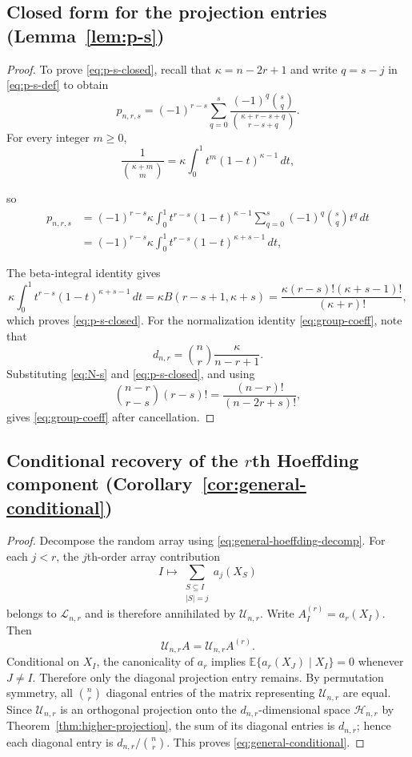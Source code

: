 \documentclass[11pt]{article}
\theoremstyle{plain}
\theoremstyle{definition}
\theoremstyle{remark}
\newcommand{\E}{\mathbb E}
\newcommand{\cU}{\mathcal U}
\newcommand{\cH}{\mathcal H}
\newcommand{\cL}{\mathcal L}
\begin{document}
\subsection{Closed form for the projection entries
  (Lemma~\ref{lem:p-s})}
\label{app:p-s-proof}
\begin{proof}
To prove \eqref{eq:p-s-closed}, recall that $\kappa=n-2r+1$ and write
$q=s-j$ in \eqref{eq:p-s-def} to obtain
\[
 p_{n,r,s}
 =(-1)^{r-s}\sum_{q=0}^s
 \frac{(-1)^q\binom{s}{q}}
      {\binom{\kappa+r-s+q}{r-s+q}}.
\]
For every integer $m\ge0$,
\[
\frac{1}{\binom{\kappa+m}{m}}
 =\kappa\int_0^1t^m(1-t)^{\kappa-1}\,dt,
\]
\begin{samepage}
so
\begin{align*}
 p_{n,r,s}
 &=(-1)^{r-s}\kappa\int_0^1
   t^{r-s}(1-t)^{\kappa-1}
   \sum_{q=0}^s(-1)^q\binom sqt^q\,dt\\
 &=(-1)^{r-s}\kappa\int_0^1
   t^{r-s}(1-t)^{\kappa+s-1}\,dt,
\end{align*}
\end{samepage}
The beta-integral identity gives
\[
 \kappa\int_0^1 t^{r-s}(1-t)^{\kappa+s-1}\,dt
 =\kappa B(r-s+1,\kappa+s)
 =\frac{\kappa(r-s)!(\kappa+s-1)!}{(\kappa+r)!},
\]
which proves \eqref{eq:p-s-closed}.  For the normalization identity
\eqref{eq:group-coeff}, note that
\[
 d_{n,r}=\binom nr\frac{\kappa}{n-r+1}.
\]
Substituting \eqref{eq:N-s} and \eqref{eq:p-s-closed}, and using
\[
 \binom{n-r}{r-s}(r-s)!
 =\frac{(n-r)!}{(n-2r+s)!},
\]
gives \eqref{eq:group-coeff} after cancellation.
\end{proof}

\subsection{\texorpdfstring{{Conditional recovery of the $r$th Hoeffding component
  (Corollary~\ref{cor:general-conditional})}}{Conditional recovery of the rth Hoeffding component}}
\label{app:proof-general-conditional}
\begin{proof}
Decompose the random array using \eqref{eq:general-hoeffding-decomp}.  For each
$j<r$, the $j$th-order array contribution
\[
 I\longmapsto
 \sum_{\substack{S\subseteq I\\|S|=j}}a_j(X_S)
\]
belongs to $\cL_{n,r}$ and is therefore annihilated by $\cU_{n,r}$.  Write
$A_I^{(r)}=a_r(X_I)$.  Then
\[
 \cU_{n,r}A=\cU_{n,r}A^{(r)}.
\]
Conditional on $X_I$, the canonicality of $a_r$ implies
$\E\{a_r(X_J)\mid X_I\}=0$ whenever $J\ne I$.  Therefore only the diagonal
projection entry remains.  By permutation symmetry, all
$\binom nr$ diagonal entries of the matrix representing $\cU_{n,r}$ are
equal.  Since $\cU_{n,r}$ is an orthogonal projection onto the
$d_{n,r}$-dimensional space $\cH_{n,r}$ by
Theorem~\ref{thm:higher-projection}, the sum of its diagonal entries is
$d_{n,r}$; hence each diagonal entry is
$d_{n,r}/\binom nr$.  This proves \eqref{eq:general-conditional}.
\end{proof}
\end{document}
